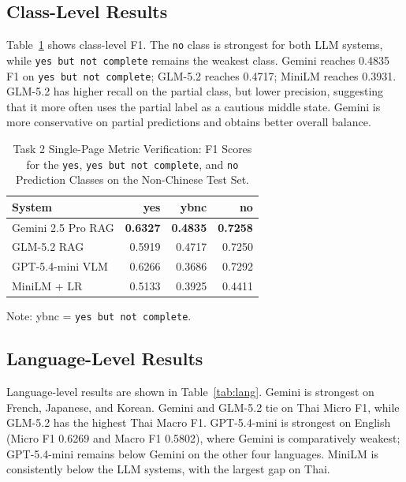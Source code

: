 \documentclass[sigconf,article]{acmart}
\begin{document}
\subsection{Class-Level Results}
Table~\ref{tab:class} shows class-level F1. The \texttt{no} class is strongest for both LLM systems, while \texttt{yes but not complete} remains the weakest class. Gemini reaches 0.4835 F1 on \texttt{yes but not complete}; GLM-5.2 reaches 0.4717; MiniLM reaches 0.3931. GLM-5.2 has higher recall on the partial class, but lower precision, suggesting that it more often uses the partial label as a cautious middle state. Gemini is more conservative on partial predictions and obtains better overall balance.

\begin{table}[t]
\caption{Task 2 Single-Page Metric Verification: F1 Scores for the \texttt{yes}, \texttt{yes but not complete}, and \texttt{no} Prediction Classes on the Non-Chinese Test Set.}
\label{tab:class}
\centering
\begin{tabular}{lrrr}
\toprule
System & yes & ybnc & no \\
\midrule
Gemini 2.5 Pro RAG & \textbf{0.6327} & \textbf{0.4835} & \textbf{0.7258} \\
GLM-5.2 RAG & 0.5919 & 0.4717 & 0.7250 \\
GPT-5.4-mini VLM & 0.6266 & 0.3686 & 0.7292 \\
MiniLM + LR & 0.5133 & 0.3925 & 0.4411 \\
\bottomrule
\end{tabular}
\begin{flushleft}
\small Note: ybnc = \texttt{yes but not complete}.
\end{flushleft}
\end{table}

\subsection{Language-Level Results}
Language-level results are shown in Table~\ref{tab:lang}. Gemini is strongest on French, Japanese, and Korean. Gemini and GLM-5.2 tie on Thai Micro F1, while GLM-5.2 has the highest Thai Macro F1. GPT-5.4-mini is strongest on English (Micro F1 0.6269 and Macro F1 0.5802), where Gemini is comparatively weakest; GPT-5.4-mini remains below Gemini on the other four languages. MiniLM is consistently below the LLM systems, with the largest gap on Thai.
\end{document}

